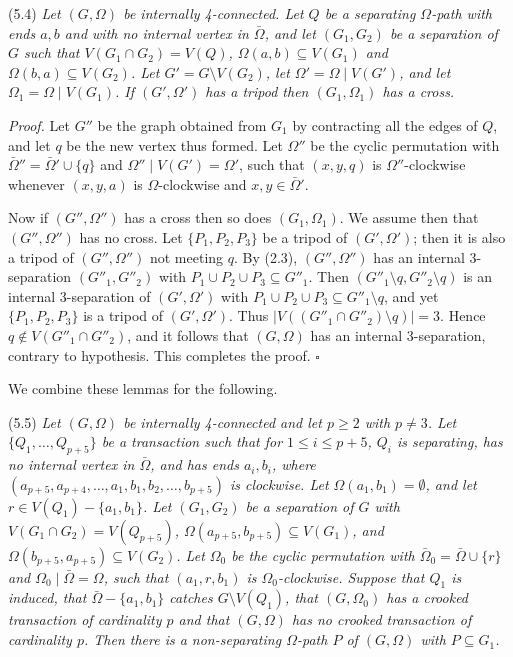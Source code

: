 \stmt
(5.4) \textit{Let $(G, \Omega)$ be internally 4-connected. Let $Q$ be a separating $\Omega$-path with ends $a, b$ and with no internal vertex in $\bar{\Omega}$, and let $(G_1, G_2)$ be a separation of $G$ such that $V(G_1 \cap G_2) = V(Q)$, $\Omega(a, b) \subseteq V(G_1)$ and $\Omega(b, a) \subseteq V(G_2)$. Let $G' = G \setminus V(G_2)$, let $\Omega' = \Omega \mid V(G')$, and let $\Omega_1 = \Omega \mid V(G_1)$. If $(G', \Omega')$ has a tripod then $(G_1, \Omega_1)$ has a cross.}

\textit{Proof.} Let $G''$ be the graph obtained from $G_1$ by contracting all the edges of $Q$, and let $q$ be the new vertex thus formed. Let $\Omega''$ be the cyclic permutation with $\bar{\Omega}'' = \bar{\Omega}' \cup \{q\}$ and $\Omega'' \mid V(G') = \Omega'$, such that $(x, y, q)$ is $\Omega''$-clockwise whenever $(x, y, a)$ is $\Omega$-clockwise and $x, y \in \bar{\Omega}'$.

Now if $(G'', \Omega'')$ has a cross then so does $(G_1, \Omega_1)$. We assume then that $(G'', \Omega'')$ has no cross. Let $\{P_1, P_2, P_3\}$ be a tripod of $(G', \Omega')$; then it is also a tripod of $(G'', \Omega'')$ not meeting $q$. By (2.3), $(G'', \Omega'')$ has an internal 3-separation $(G''_1, G''_2)$ with $P_1 \cup P_2 \cup P_3 \subseteq G''_1$. Then $(G''_1 \setminus q, G''_2 \setminus q)$ is an internal 3-separation of $(G', \Omega')$ with $P_1 \cup P_2 \cup P_3 \subseteq G''_1 \setminus q$, and yet $\{P_1, P_2, P_3\}$ is a tripod of $(G', \Omega')$. Thus $|V((G''_1 \cap G''_2) \setminus q)| = 3$. Hence $q \notin V(G''_1 \cap G''_2)$, and it follows that $(G, \Omega)$ has an internal 3-separation, contrary to hypothesis. This completes the proof. $\square$

We combine these lemmas for the following.

\stmt
(5.5) \textit{Let $(G, \Omega)$ be internally 4-connected and let $p \ge 2$ with $p \ne 3$. Let $\{Q_1, \dots, Q_{p+5}\}$ be a transaction such that for $1 \le i \le p+5$, $Q_i$ is separating, has no internal vertex in $\bar{\Omega}$, and has ends $a_i, b_i$, where $(a_{p+5}, a_{p+4}, \dots, a_1, b_1, b_2, \dots, b_{p+5})$ is clockwise. Let $\Omega(a_1, b_1) = \emptyset$, and let $r \in V(Q_1) - \{a_1, b_1\}$. Let $(G_1, G_2)$ be a separation of $G$ with $V(G_1 \cap G_2) = V(Q_{p+5})$, $\Omega(a_{p+5}, b_{p+5}) \subseteq V(G_1)$, and $\Omega(b_{p+5}, a_{p+5}) \subseteq V(G_2)$. Let $\Omega_0$ be the cyclic permutation with $\bar{\Omega}_0 = \bar{\Omega} \cup \{r\}$ and $\Omega_0 \mid \bar{\Omega} = \Omega$, such that $(a_1, r, b_1)$ is $\Omega_0$-clockwise. Suppose that $Q_1$ is induced, that $\bar{\Omega} - \{a_1, b_1\}$ catches $G \setminus V(Q_1)$, that $(G, \Omega_0)$ has a crooked transaction of cardinality $p$ and that $(G, \Omega)$ has no crooked transaction of cardinality $p$. Then there is a non-separating $\Omega$-path $P$ of $(G, \Omega)$ with $P \subseteq G_1$.}


